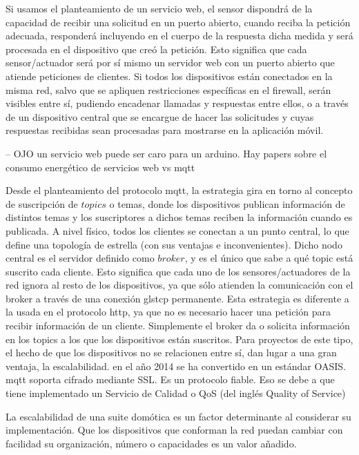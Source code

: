 \vspace{1cm}

Si usamos el planteamiento de un servicio web, el sensor dispondrá de la capacidad de recibir una solicitud en un puerto abierto, cuando reciba la petición adecuada, responderá incluyendo en el cuerpo de la respuesta dicha medida y será procesada en el dispositivo que creó la petición. Esto significa que cada sensor/actuador será por sí mismo un servidor web con un puerto abierto que atiende peticiones de clientes. Si todos los dispositivos están conectados en la misma red, salvo que se apliquen restricciones específicas en el firewall, serán visibles entre sí, pudiendo encadenar llamadas y respuestas entre ellos, o a través de un dispositivo central que se encargue de hacer las solicitudes y cuyas respuestas recibidas sean procesadas para mostrarse en la aplicación móvil.

 -- OJO
 un servicio web puede ser caro para un arduino. Hay papers sobre el consumo energético de servicios web vs mqtt

Desde el planteamiento del protocolo \gls{mqtt}, la estrategia gira en torno al concepto de suscripción de $topics$ o temas, donde los dispositivos publican información de distintos temas y los suscriptores a dichos temas reciben la información cuando es publicada. A nivel físico, todos los clientes se conectan a un punto central, lo que define una topología de estrella (con sus ventajas e inconvenientes). Dicho nodo central es el servidor definido como $broker$, y es el único que sabe a qué topic está suscrito cada cliente. Esto significa que cada uno de los sensores/actuadores de la red ignora al resto de los dispositivos, ya que sólo atienden la comunicación con el broker a través de una conexión gls{tcp} permanente. Esta estrategia es diferente a la usada en el protocolo \gls{http}, ya que no es necesario hacer una petición para recibir información de un cliente. Simplemente el broker da o solicita información en los topics a los que los dispositivos están suscritos. Para proyectos de este tipo, el hecho de que los dispositivos no se relacionen entre sí, dan lugar a una gran ventaja, la escalabilidad. en el año 2014 se ha convertido en un estándar OASIS. \gls{mqtt} soporta cifrado mediante SSL. Es un protocolo fiable. Eso se debe a que tiene implementado un Servicio de Calidad o QoS (del inglés Quality of Service)

\vspace{1.5cm}

La escalabilidad de una suite domótica es un factor determinante al considerar su implementación. Que los dispositivos que conforman la red puedan cambiar con facilidad su organización, número o capacidades es un valor añadido.

